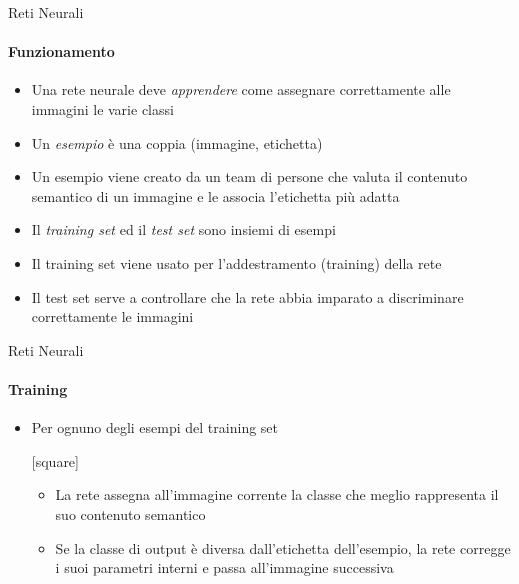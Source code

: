 \documentclass[
 ]{beamer}
\begin{document}
\begin{frame}{Reti Neurali}
    \framesubtitle{Funzionamento}
    \begin{itemize} [<+->]
        \setlength\itemsep{1em}
        \item \large Una rete neurale deve \emph{apprendere} come assegnare correttamente alle immagini le varie classi
        \item \large Un \emph{esempio} è una coppia (immagine, etichetta)
        \item \large Un esempio viene creato da un team di persone che valuta il contenuto semantico di un immagine e le associa l'etichetta più adatta 
        \item \large Il \emph{training set} ed il \emph{test set} sono insiemi di esempi
        \item \large Il training set viene usato per l'addestramento (training) della rete
        \item \large Il test set serve a controllare che la rete abbia imparato a discriminare correttamente le immagini       
    \end{itemize}
\end{frame}

\begin{frame}{Reti Neurali}
    \framesubtitle{Training}
    \begin{itemize} [<+->]
        \setlength\itemsep{2em}
        \item \large Per ognuno degli esempi del training set
        
        \bigskip
        \bigskip
        
        [square] 
        \begin{itemize} 
        \setlength\itemsep{3em}
            \item \large La rete assegna all'immagine corrente la classe che meglio rappresenta il suo contenuto semantico
            \item \large Se la classe di output è diversa dall'etichetta dell'esempio, la rete corregge i suoi parametri interni e passa all'immagine successiva
        \end{itemize}
    \end{itemize}
\end{frame}
\end{document}
